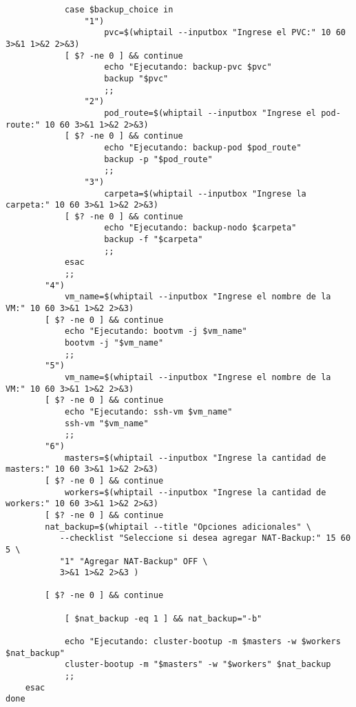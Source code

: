 \begin{verbatim}
            case $backup_choice in
                "1")
                    pvc=$(whiptail --inputbox "Ingrese el PVC:" 10 60 3>&1 1>&2 2>&3)
		    [ $? -ne 0 ] && continue
                    echo "Ejecutando: backup-pvc $pvc"
                    backup "$pvc"
                    ;;
                "2")
                    pod_route=$(whiptail --inputbox "Ingrese el pod-route:" 10 60 3>&1 1>&2 2>&3)
		    [ $? -ne 0 ] && continue
                    echo "Ejecutando: backup-pod $pod_route"
                    backup -p "$pod_route"
                    ;;
                "3")
                    carpeta=$(whiptail --inputbox "Ingrese la carpeta:" 10 60 3>&1 1>&2 2>&3)
		    [ $? -ne 0 ] && continue
                    echo "Ejecutando: backup-nodo $carpeta"
                    backup -f "$carpeta"
                    ;;
            esac
            ;;
        "4")
            vm_name=$(whiptail --inputbox "Ingrese el nombre de la VM:" 10 60 3>&1 1>&2 2>&3)
	    [ $? -ne 0 ] && continue
            echo "Ejecutando: bootvm -j $vm_name"
            bootvm -j "$vm_name"
            ;;
        "5")
            vm_name=$(whiptail --inputbox "Ingrese el nombre de la VM:" 10 60 3>&1 1>&2 2>&3)
	    [ $? -ne 0 ] && continue
            echo "Ejecutando: ssh-vm $vm_name"
            ssh-vm "$vm_name"
            ;;
        "6")
            masters=$(whiptail --inputbox "Ingrese la cantidad de masters:" 10 60 3>&1 1>&2 2>&3)
	    [ $? -ne 0 ] && continue
            workers=$(whiptail --inputbox "Ingrese la cantidad de workers:" 10 60 3>&1 1>&2 2>&3)
	    [ $? -ne 0 ] && continue
	    nat_backup=$(whiptail --title "Opciones adicionales" \
	       --checklist "Seleccione si desea agregar NAT-Backup:" 15 60 5 \
	       "1" "Agregar NAT-Backup" OFF \
	       3>&1 1>&2 2>&3 )

	    [ $? -ne 0 ] && continue

            [ $nat_backup -eq 1 ] && nat_backup="-b"

            echo "Ejecutando: cluster-bootup -m $masters -w $workers $nat_backup"
            cluster-bootup -m "$masters" -w "$workers" $nat_backup
            ;;
    esac
done
\end{verbatim}